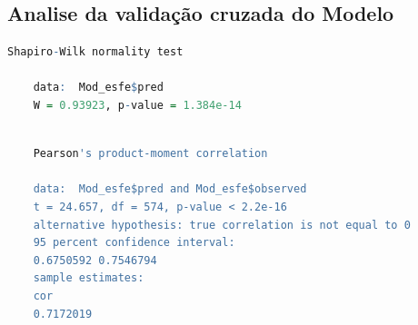  \subsection{Analise da validação cruzada do Modelo }
 
   \lstset{
 	language=R, %
 	caption= Resultado do Teste Shapiro-Wilk em linguagem R,} %
 \begin{lstlisting}[language=R]
 	Shapiro-Wilk normality test
 	
 	data:  Mod_esfe$pred
 	W = 0.93923, p-value = 1.384e-14
 \end{lstlisting} 
 
   \lstset{
 	language=R, %
 	caption= Resultado do Teste de Correlação em linguagem R,} %
 \begin{lstlisting}[language=R]
 	
 	Pearson's product-moment correlation
 	
 	data:  Mod_esfe$pred and Mod_esfe$observed
 	t = 24.657, df = 574, p-value < 2.2e-16
 	alternative hypothesis: true correlation is not equal to 0
 	95 percent confidence interval:
 	0.6750592 0.7546794
 	sample estimates:
 	cor 
 	0.7172019 
 \end{lstlisting}   
 
